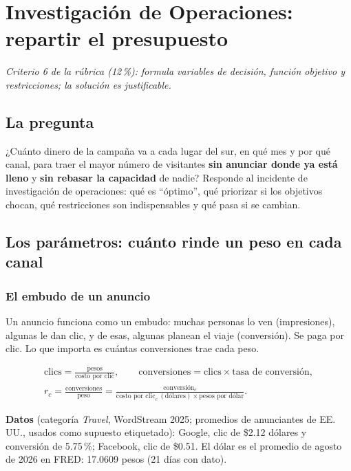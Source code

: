 \chapter{Investigación de Operaciones: repartir el presupuesto}
\label{cap:io}
\textit{Criterio 6 de la rúbrica (12\,\%): formula variables de decisión, función objetivo y restricciones; la solución es
justificable.}

\section{La pregunta}
¿Cuánto dinero de la campaña va a cada lugar del sur, en qué mes y por qué canal, para traer el mayor número de visitantes
\textbf{sin anunciar donde ya está lleno} y \textbf{sin rebasar la capacidad} de nadie? Responde al incidente de
investigación de operaciones: qué es ``óptimo'', qué priorizar si los objetivos chocan, qué restricciones son
indispensables y qué pasa si se cambian.

\section{Los parámetros: cuánto rinde un peso en cada canal}
\subsection{El embudo de un anuncio}
\begin{intuicion}
Un anuncio funciona como un embudo: muchas personas lo ven (impresiones), algunas le dan clic, y de esas, algunas planean
el viaje (conversión). Se paga por clic. Lo que importa es cuántas conversiones trae cada peso.
\end{intuicion}

\begin{gather*}
\text{clics}=\frac{\text{pesos}}{\text{costo por clic}},\qquad \text{conversiones}=\text{clics}\times\text{tasa de conversión},\\
r_c=\frac{\text{conversiones}}{\text{peso}}=\frac{\text{conversión}_c}{\text{costo por clic}_c\ (\text{dólares})\times\text{pesos por dólar}} .
\end{gather*}

\textbf{Datos} (categoría \emph{Travel}, WordStream 2025; promedios de anunciantes de EE.\,UU., usados como supuesto
etiquetado): Google, clic de \$2.12 dólares y conversión de 5.75\,\%; Facebook, clic de \$0.51. El dólar es el promedio de
agosto de 2026 en FRED: 17.0609 pesos (21 días con dato).

